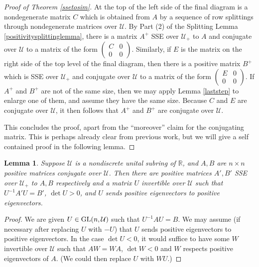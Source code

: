 \documentclass{amsart}
\newtheorem{lemma}[theorem]{Lemma}
\theoremstyle{definition}
\theoremstyle{remark}
\numberwithin{equation}{section}
\begin{document}
{{\begin{proof}[Proof of Theorem 
\ref{ssetosim}]
At the top of the left side of the final diagram is a nondegenerate matrix 
$C$ which is obtained from $A$ by a sequence of row splittings through 
nondegenerate matrices over $\mathcal U$. By Part (2) of the 
Splitting Lemma \ref{positivitysplittinglemma}, 
there is a  matrix $A^+$ SSE over $\mathcal U_+$ to $A$ and 
conjugate over  $\mathcal U$ to a matrix of  the form 
$\left(\begin{smallmatrix} C & 0 \\ 0& 0 
\end{smallmatrix}\right)$. Similarly, if $E$ is the matrix on the right 
side of the top level of the final diagram, then there is a positive 
matrix  $B^+$ which is SSE over $\mathcal U_+$ and conjugate over $\mathcal U$ 
to a matrix of the form 
$\left(\begin{smallmatrix} E & 0 \\ 0& 0 
\end{smallmatrix}\right)$. If $A^+$ and $B^+$ are not of the same size, 
then we may apply Lemma \ref{laststep}  to enlarge one of them, and assume 
they have the same size. Because $C$ and $E$ are conjugate over $\mathcal U$, 
it then follows that $A^+$ and $B^+$ are conjugate over $\mathcal U$. 

  This concludes the 
proof, apart from the ``moreover'' claim for the conjugating 
matrix. This is perhaps already clear from previous work, but 
we will give a self contained proof in the following lemma.  
\end{proof} 


\begin{lemma} 
Suppose $\mathcal U$ is a nondiscrete unital subring of $\mathbb R$, 
and $A,B$ are $n\times n$ positive matrices conjugate over 
$\mathcal U$. Then there are positive matrices $A',B'$ SSE over 
$\mathcal U_+$ to $A,B$ respectively and a matrix $U$ invertible over 
$\mathcal U$ such that $U^{-1}A'U=B'$, $\det U > 0$, and 
$U$ sends positive eigenvectors to positive eigenvectors. 
\end{lemma} 

\begin{proof} 
We are given $U\in \textnormal{GL}(n,\mathcal U)$ such that 
$U^{-1}AU=B$. We may assume (if necessary after replacing 
$U$ with $-U$) that $U$ sends positive eigenvectors to 
positive eigenvectors. 
In the case $\det U < 0$, it would suffice to have some $W$ invertible 
over $\mathcal U$ such that 
$AW=WA$, $\det W < 0$ and $W$  
respects positive eigenvectors of $A$. (We could then replace 
$U$ with $WU$.) 


\end{proof}}}
\end{document}

